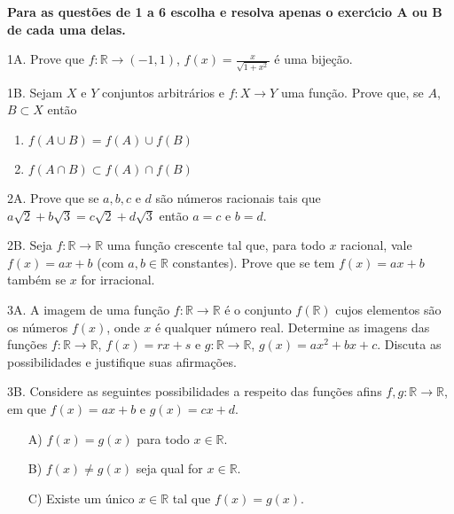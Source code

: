 \documentclass{prova}
\newcommand{\ds}{\displaystyle}
\begin{document}

	\textbf{Para as quest\~oes de 1 a 6 escolha e resolva apenas o exerc\'{\i}cio A ou B de cada uma delas.}

	\begin{questionario}
        \item[1A.] Prove que $f:\mathbb{R}\rightarrow(-1,1)$,
            $f(x)=\ds\frac{x}{\sqrt{1+x^2}}$ \'e uma bije\c{c}\~ao.
        \item[1B.] Sejam $X$ e $Y$ conjuntos arbitr\'arios e $f:X\rightarrow Y$
            uma fun\c{c}\~ao. Prove que, se $A$, $B\subset X$ ent\~ao
            \begin{enumerate}
                \item $f(A\cup B) = f(A) \cup f(B)$
                \item $f(A\cap B) \subset f(A) \cap f(B)$
            \end{enumerate}
        \item[2A.] Prove que se $a,b,c$ e $d$ s\~ao n\'umeros racionais tais que
            $a\sqrt{2}+b\sqrt{3}=c\sqrt{2}+d\sqrt{3}$ ent\~ao $a=c$ e $b=d$.
        \item[2B.] Seja $f:\mathbb{R}\rightarrow\mathbb{R}$ uma fun\c{c}\~ao
            crescente tal que, para todo $x$ racional, vale $f(x)=ax+b$ (com
            $a,b\in\mathbb{R}$ constantes). Prove que se tem $f(x)=ax+b$ tamb\'em se $x$ for
            irracional.
        \item[3A.] A imagem de uma fun\c{c}\~ao $f:\mathbb{R}\rightarrow\mathbb{R}$ \'e
            o conjunto $f(\mathbb{R})$ cujos elementos s\~ao os n\'umeros $f(x)$, onde $x$ \'e
            qualquer n\'umero real. Determine as imagens das fun\c{c}\~oes
            $f:\mathbb{R}\rightarrow\mathbb{R}$, $f(x)=rx+s$ e
            $g:\mathbb{R}\rightarrow\mathbb{R}$, $g(x)=ax^2+bx+c$. Discuta as
            possibilidades e justifique suas afirma\c{c}\~oes.
        \item[3B.] Considere as seguintes possibilidades a respeito das fun\c{c}\~oes
            afins $f,g:\mathbb{R}\rightarrow\mathbb{R}$, em que $f(x)=ax+b$ e $g(x)=cx+d$.
            \begin{enumerate}
                \item[A)] $f(x) = g(x)$ para todo $x\in\mathbb{R}$.
                \item[B)] $f(x)\neq g(x)$ seja qual for $x\in\mathbb{R}$.
                \item[C)] Existe um \'unico $x\in\mathbb{R}$ tal que $f(x)=g(x)$.

\end{enumerate}
\end{questionario}
\end{document}
